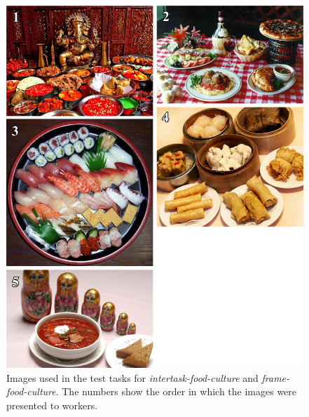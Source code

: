 \documentclass[12pt]{article}
\begin{document}
\begin{figure}
	\begin{center}
	\includegraphics{figs/task2-test.jpg}
	\end{center}
	\caption{
		Images used in the test tasks for \textit{intertask-food-culture} 
		and \textit{frame-food-culture}.  
		The numbers show the order in which the 
		images were presented to workers.
	}
	\label{fig:task2:test}
\end{figure}
\end{document}
